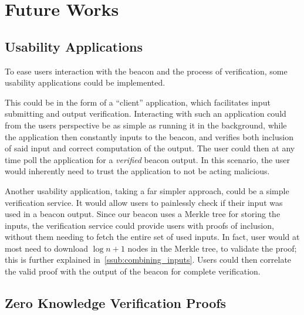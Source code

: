 \section{Future Works}%
\label{sec:future_works}

\subsection{Usability Applications}%
\label{sub:usability_applications}
To ease users interaction with the beacon and the process of verification, some usability applications could be implemented.

This could be in the form of a \enquote{client} application, which facilitates input submitting and output verification.
Interacting with such an application could from the users perspective be as simple as running it in the background, while the application then constantly inputs to the beacon, and verifies both inclusion of said input and correct computation of the output.
The user could then at any time poll the application for a \emph{verified} beacon output.
In this scenario, the user would inherently need to trust the application to not be acting malicious.

Another usability application, taking a far simpler approach, could be a simple verification service.
It would allow users to painlessly check if their input was used in a beacon output.
Since our beacon uses a Merkle tree for storing the inputs, the verification service could provide users with proofs of inclusion, without them needing to fetch the entire set of used inputs.
In fact, user would at most need to download $\log n + 1$ nodes in the Merkle tree, to validate the proof; this is further explained in~\vref{ssub:combining_inputs}.
Users could then correlate the valid proof with the output of the beacon for complete verification.

\subsection{Zero Knowledge Verification Proofs}%
\label{sub:zero_knowledge_verification_proofs}
